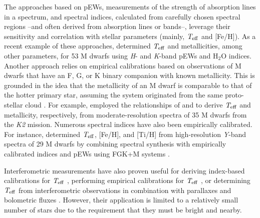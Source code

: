 The approaches based on pEWs, measurements of the strength of absorption lines in a spectrum, and spectral indices, calculated from carefully chosen spectral regions --and  often derived from absorption lines or bands--, leverage their sensitivity and correlation with stellar parameters (mainly, $\textit{T}_{\rm eff}$ and [Fe/H]). As a recent example of these approaches, \citet{Khata2020} determined $\textit{T}_{\rm eff}$ and  metallicities, among other parameters, for 53 M dwarfs using \textit{H}- and \textit{K}-band pEWs and H$_{2}$O indices.
Another approach relies on empirical calibrations based on observations of M dwarfs that have an F, G, or K binary companion with known metallicity. This is grounded in the idea that the metallicity of an M dwarf is comparable to that of the hotter primary star, assuming the system originated from the same proto-stellar cloud \citep{Neves2012,montes2018,duque24}. For example, \citet{Rodriguez2019} employed the relationships of \citet{Newton2015} and \citet{Mann2013b} to derive $\textit{T}_{\rm eff}$ and metallicity, respectively, from moderate-resolution spectra of 35 M dwarfs from the \textit{K2} mission.
Numerous spectral indices have also been empirically calibrated. For instance, \citet{Veyette2017} determined $\textit{T}_{\rm eff}$, [Fe/H], and [Ti/H] from high-resolution \textit{Y}-band spectra of 29 M dwarfs by combining spectral synthesis with empirically calibrated indices and pEWs using FGK+M systems \citep{bonfils2005,Mann2013}.

Interferometric measurements have also proven useful for deriving index-based calibrations for $\textit{T}_{\rm eff}$ \citep{Mann2013b}, performing empirical calibrations for $\textit{T}_{\rm eff}$ \citep{maldonado2015,Newton2015}, or determining $\textit{T}_{\rm eff}$ from interferometric observations in combination with parallaxes and bolometric fluxes \citep{Boyajian2012,vonBraun2014,Rabus2019}. However, their application is limited to a relatively small number of stars due to the requirement that they must be bright and nearby.

